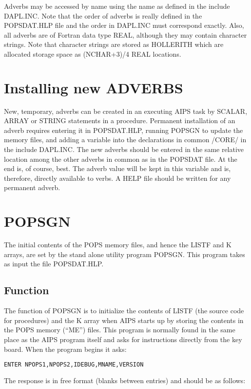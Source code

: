 Adverbs may be accessed by name using the name as defined in the
include DAPL.INC.  Note that the order of adverbs is really defined in
the POPSDAT.HLP file and the order in DAPL.INC must correspond
exactly.  Also, all adverbs are of Fortran data type REAL, although
they may contain character strings.  Note that character strings are
stored as HOLLERITH which are allocated storage space as (NCHAR+3)/4 REAL
locations.


\section{Installing new ADVERBS }
New, temporary, adverbs can be created in an executing AIPS task by
SCALAR, ARRAY or STRING statements in a procedure.  Permanent
installation of an adverb requires entering it in POPSDAT.HLP, running
POPSGN to update the memory files, and adding a variable into the
declarations in common /CORE/ in the include DAPL.INC.
The new adverbs should be entered in the same relative location among
the other adverbs in common as in the POPSDAT file. At the end is,
of course, best.  The adverb value will be kept in this variable and
is, therefore, directly available to verbs.  A HELP file should be
written for any permanent adverb.

\section{POPSGN}

The initial contents of the POPS memory files, and hence the LISTF and
K arrays, are set by the stand alone utility program POPSGN. This
program takes as input the file POPSDAT.HLP.


\subsection{Function}
The function of POPSGN is to initialize the contents of LISTF (the
source code for procedures) and the K array when AIPS starts up by
storing the contents in the POPS memory (``ME'') files.  This program is
normally found in the same place as the AIPS program itself and asks
for instructions directly from the key board.  When the program begins
it asks:
\begin{verbatim}
ENTER NPOPS1,NPOPS2,IDEBUG,MNAME,VERSION
\end{verbatim}
The response is in free format (blanks between entries) and should be
as follows:


